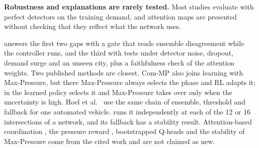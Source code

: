 \textbf{Robustness and explanations are rarely tested.} Most studies evaluate with perfect
detectors on the training demand, and attention maps are presented without checking that they
reflect what the network uses.

\ugmarl{} answers the first two gaps with a gate that reads ensemble disagreement while the
controller runs, and the third with tests under detector noise, dropout, demand surge and an
unseen city, plus a faithfulness check of the attention weights. Two published methods are
closest. Com-MP \citep{zhu2026commp} also joins learning with Max-Pressure, but there
Max-Pressure always selects the phase and RL adapts it; in \ugmarl{} the learned policy
selects it and Max-Pressure takes over only when the uncertainty is high. Hoel et al.\
\citep{hoel2020tactical} use the same chain of ensemble, threshold and fallback for one
automated vehicle. \ugmarl{} runs it independently at each of the 12 or 16 intersections of a
network, and its fallback has a stability result. Attention-based coordination \citep{wei2019colight}, the
pressure reward \citep{wei2019presslight}, bootstrapped Q-heads \citep{osband2016deep} and the
stability of Max-Pressure \citep{varaiya2013max} come from the cited work and are not claimed
as new.
